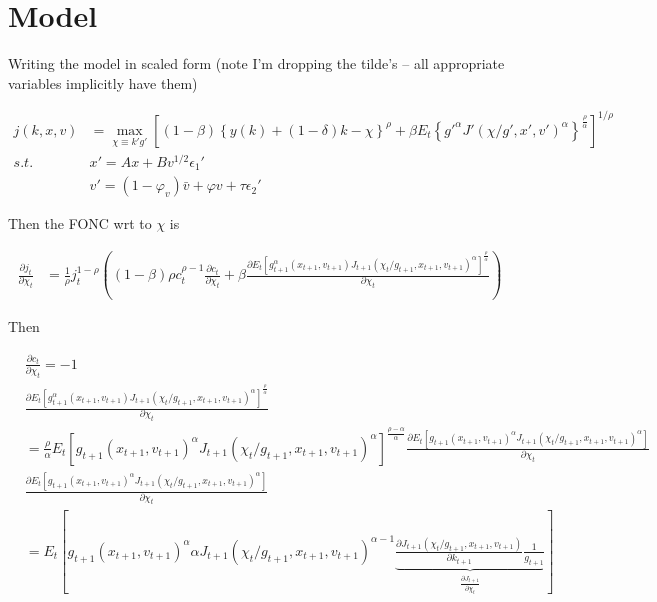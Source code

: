 \documentclass[10pt]{article}
\newcommand{\fracpd}[2]{
  \ensuremath{\frac{\partial #1}{\partial #2}}
}
\begin{document}
\section{Model}

Writing the model in scaled form (note I'm dropping the tilde's -- all appropriate variables implicitly have them)

\begin{align*}
  j(k, x, v) &= \max_{\chi \equiv k'g'} \left[ (1 - \beta) \left\{ y(k) + (1 - \delta)k - \chi \right\}^{\rho} + \beta E_t \left\{g'^{\alpha} J'(\chi/g', x', v')^{\alpha} \right\}^{\frac{\rho}{\alpha}} \right]^{1/\rho} \\
  s.t. \quad & x' = A x +  B v^{1/2} \epsilon_1' \\
  & v' = (1 - \varphi_v) \bar{v} + \varphi v+  \tau \epsilon_2'
\end{align*}

Then the FONC wrt to $\chi$ is

\begin{align*}
  \fracpd{j_t}{\chi_t} &= \frac{1}{\rho} j_{t}^{1 -  \rho} \left( (1 - \beta) \rho c_t^{\rho - 1} \fracpd{c_t}{\chi_t} + \beta \fracpd{E_t \left[ g_{t+1}^{\alpha}(x_{t+1}, v_{t+1}) J_{t+1}(\chi_t/g_{t+1}, x_{t+1}, v_{t+1})^{\alpha} \right]^{\frac{\rho}{\alpha}}}{\chi_t} \right)
\end{align*}

Then

\begin{align*}
  &\fracpd{c_{t}}{\chi_t} = -1 \\
  &\fracpd{E_t \left[ g_{t+1}^{\alpha}(x_{t+1}, v_{t+1}) J_{t+1}(\chi_t/g_{t+1}, x_{t+1}, v_{t+1})^{\alpha} \right]^{\frac{\rho}{\alpha}}}{\chi_t} \\&= \frac{\rho}{\alpha} E_t \left[ g_{t+1}(x_{t+1}, v_{t+1})^{\alpha} J_{t+1}(\chi_t/g_{t+1}, x_{t+1}, v_{t+1})^{\alpha} \right]^{\frac{\rho - \alpha}{\alpha}} \fracpd{E_t\left[ g_{t+1}(x_{t+1}, v_{t+1})^{\alpha} J_{t+1}(\chi_t/g_{t+1}, x_{t+1}, v_{t+1})^{\alpha} \right]}{\chi_t} \\
  &\fracpd{E_t\left[ g_{t+1}(x_{t+1}, v_{t+1})^{\alpha} J_{t+1}(\chi_t/g_{t+1}, x_{t+1}, v_{t+1})^{\alpha} \right]}{\chi_t} \\&= E_t \left[ g_{t+1}(x_{t+1}, v_{t+1})^{\alpha} \alpha J_{t+1}(\chi_t/g_{t+1}, x_{t+1}, v_{t+1})^{\alpha - 1} \underbrace{\fracpd{J_{t+1}(\chi_t/g_{t+1}, x_{t+1}, v_{t+1})}{k_{t+1}} \frac{1}{g_{t+1}}}_{\fracpd{J_{t+1}}{\chi_t}} \right]
\end{align*}
\end{document}
